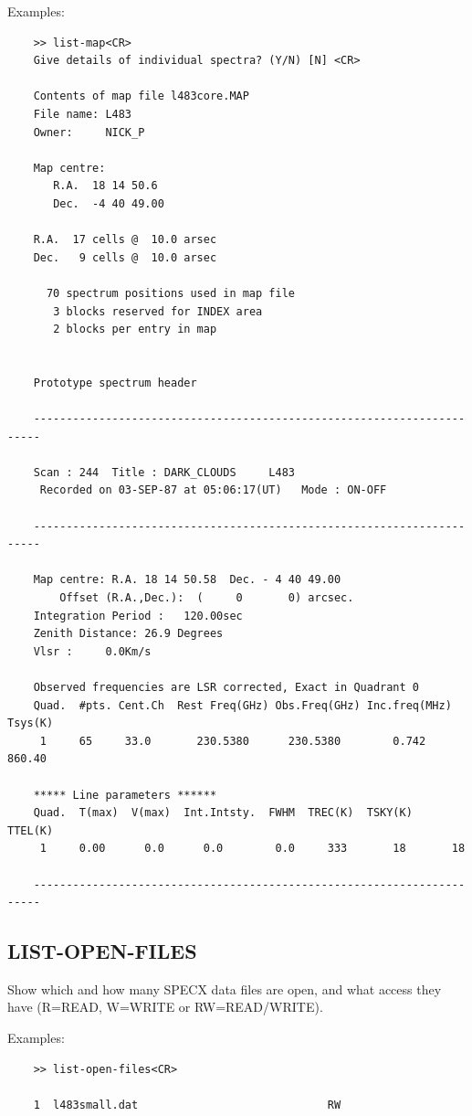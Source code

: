 \documentclass[11pt,twoside]{report}
\begin{document}
Examples:
\begin{verbatim}
    >> list-map<CR>
    Give details of individual spectra? (Y/N) [N] <CR>

    Contents of map file l483core.MAP
    File name: L483
    Owner:     NICK_P

    Map centre:
       R.A.  18 14 50.6
       Dec.  -4 40 49.00

    R.A.  17 cells @  10.0 arsec
    Dec.   9 cells @  10.0 arsec

      70 spectrum positions used in map file
       3 blocks reserved for INDEX area
       2 blocks per entry in map


    Prototype spectrum header

    -----------------------------------------------------------------------

    Scan : 244  Title : DARK_CLOUDS     L483
     Recorded on 03-SEP-87 at 05:06:17(UT)   Mode : ON-OFF

    -----------------------------------------------------------------------

    Map centre: R.A. 18 14 50.58  Dec. - 4 40 49.00
        Offset (R.A.,Dec.):  (     0       0) arcsec.
    Integration Period :   120.00sec
    Zenith Distance: 26.9 Degrees
    Vlsr :     0.0Km/s

    Observed frequencies are LSR corrected, Exact in Quadrant 0
    Quad.  #pts. Cent.Ch  Rest Freq(GHz) Obs.Freq(GHz) Inc.freq(MHz) Tsys(K)
     1     65     33.0       230.5380      230.5380        0.742    860.40

    ***** Line parameters ******
    Quad.  T(max)  V(max)  Int.Intsty.  FWHM  TREC(K)  TSKY(K)  TTEL(K)
     1     0.00      0.0      0.0        0.0     333       18       18

    -----------------------------------------------------------------------

\end{verbatim}

\subsection{LIST-OPEN-FILES} 

Show which and how many SPECX data files are open, and what access they have
(R=READ, W=WRITE or RW=READ/WRITE).

Examples:
\begin{verbatim}
    >> list-open-files<CR>

    1  l483small.dat                             RW

\end{verbatim}
\end{document}
